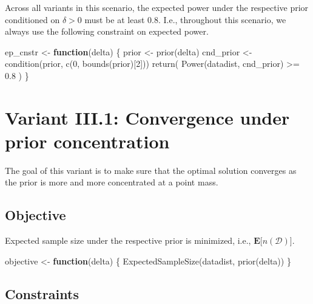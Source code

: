 \documentclass[
]{book}
\newenvironment{Shaded}{\begin{snugshade}}{\end{snugshade}}
\newcommand{\ControlFlowTok}[1]{\textcolor[rgb]{0.13,0.29,0.53}{\textbf{#1}}}
\newcommand{\DecValTok}[1]{\textcolor[rgb]{0.00,0.00,0.81}{#1}}
\newcommand{\FloatTok}[1]{\textcolor[rgb]{0.00,0.00,0.81}{#1}}
\newcommand{\FunctionTok}[1]{\textcolor[rgb]{0.00,0.00,0.00}{#1}}
\newcommand{\NormalTok}[1]{#1}
\newcommand{\OtherTok}[1]{\textcolor[rgb]{0.56,0.35,0.01}{#1}}
\newcommand{\SpecialCharTok}[1]{\textcolor[rgb]{0.00,0.00,0.00}{#1}}
\begin{document}
Across all variants in this scenario, the expected power under the respective
prior conditioned on \(\delta > 0\) must be at least \(0.8\).
I.e., throughout this scenario, we always use the following constraint on
expected power.

\begin{Shaded}
\begin{Highlighting}[]
\NormalTok{ep\_cnstr }\OtherTok{\textless{}{-}} \ControlFlowTok{function}\NormalTok{(delta) \{}
\NormalTok{    prior     }\OtherTok{\textless{}{-}} \FunctionTok{prior}\NormalTok{(delta)}
\NormalTok{    cnd\_prior }\OtherTok{\textless{}{-}} \FunctionTok{condition}\NormalTok{(prior, }\FunctionTok{c}\NormalTok{(}\DecValTok{0}\NormalTok{, }\FunctionTok{bounds}\NormalTok{(prior)[}\DecValTok{2}\NormalTok{]))}
    \FunctionTok{return}\NormalTok{( }\FunctionTok{Power}\NormalTok{(datadist, cnd\_prior) }\SpecialCharTok{\textgreater{}=} \FloatTok{0.8}\NormalTok{ )}
\NormalTok{\}}
\end{Highlighting}
\end{Shaded}

\hypertarget{variantIII_1}{%
\section{Variant III.1: Convergence under prior concentration}\label{variantIII_1}}

The goal of this variant is to make sure that the optimal solution
converges as the prior is more and more concentrated at a point mass.

\hypertarget{objective-6}{%
\subsection{Objective}\label{objective-6}}

Expected sample size under the respective prior is minimized, i.e.,
\(\boldsymbol{E}\big[n(\mathcal{D})\big]\).

\begin{Shaded}
\begin{Highlighting}[]
\NormalTok{objective }\OtherTok{\textless{}{-}} \ControlFlowTok{function}\NormalTok{(delta) \{}
    \FunctionTok{ExpectedSampleSize}\NormalTok{(datadist, }\FunctionTok{prior}\NormalTok{(delta))}
\NormalTok{\}}
\end{Highlighting}
\end{Shaded}

\hypertarget{constraints-6}{%
\subsection{Constraints}\label{constraints-6}}
\end{document}
